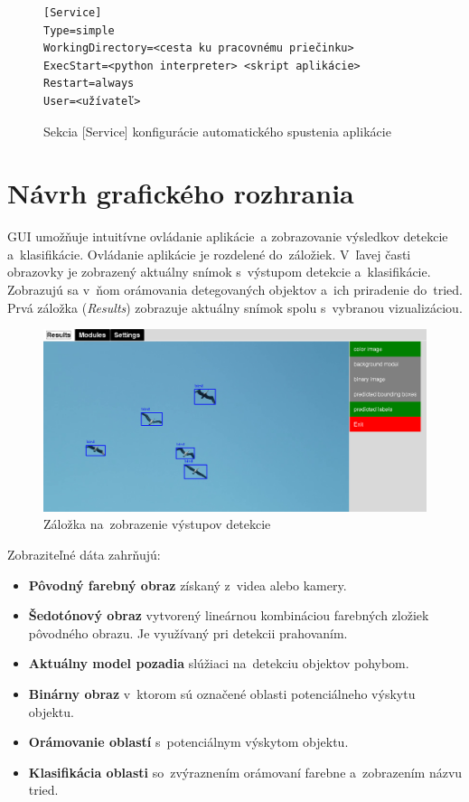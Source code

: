         \begin{figure}[H]
            \centering
            \begin{lstlisting}
[Service]
Type=simple
WorkingDirectory=<cesta ku pracovnému priečinku>
ExecStart=<python interpreter> <skript aplikácie>
Restart=always
User=<užívateľ>
            \end{lstlisting}
            \caption{Sekcia [Service] konfigurácie automatického spustenia aplikácie}
        \end{figure}

    \section{Návrh grafického rozhrania}
        \ac{GUI} umožňuje intuitívne ovládanie aplikácie~a zobrazovanie výsledkov detekcie a~klasifikácie. Ovládanie aplikácie je rozdelené do~záložiek. V~ľavej časti obrazovky je zobrazený aktuálny snímok s~výstupom detekcie a~klasifikácie. Zobrazujú sa v~ňom orámovania detegovaných objektov a~ich priradenie do~tried. Prvá záložka (\emph{Results}) zobrazuje aktuálny snímok spolu s~vybranou vizualizáciou.

        \begin{figure}[H]
            \centering
            \includegraphics[width=\textwidth]{obrazky/new_app/classification.png}
            \caption{Záložka na~zobrazenie výstupov detekcie}
        \end{figure}

        Zobraziteľné dáta zahrňujú:
        \begin{itemize}
            \item \textbf{Pôvodný farebný obraz} získaný z~videa alebo kamery.
            \item \textbf{Šedotónový obraz} vytvorený lineárnou kombináciou farebných zložiek pôvodného obrazu. Je využívaný pri detekcii prahovaním.
            \item \textbf{Aktuálny model pozadia} slúžiaci na~detekciu objektov pohybom.
            \item \textbf{Binárny obraz} v~ktorom sú označené oblasti potenciálneho výskytu objektu.
            \item \textbf{Orámovanie oblastí} s~potenciálnym výskytom objektu. 
            \item \textbf{Klasifikácia oblasti} so~zvýraznením orámovaní farebne a~zobrazením názvu tried.
        \end{itemize}

